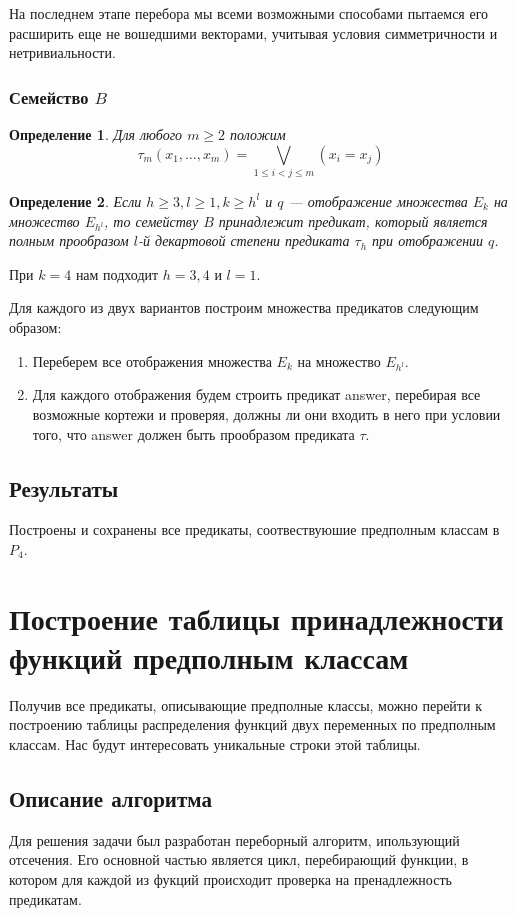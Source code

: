 \documentclass[a4paper,14pt]{extreport}
\newtheorem{opr}{Определение}
\begin{document}
На последнем этапе перебора мы  всеми возможными способами пытаемся его расширить еще не вошедшими векторами, учитывая условия симметричности и нетривиальности.

\subsection{Семейство $B$}
\begin{opr}
Для любого $m \geqslant 2$ положим
$$ \tau_m(x_1, \ldots, x_m) = \bigvee_{1\leqslant i < j \leqslant m}(x_i=x_j) $$
\end{opr}
\begin{opr}
Если $h \geqslant 3, l \geqslant 1, k \geqslant h^l$ и $q$ — отображение множества $E_k$ на  множество $E_{h^l}$, то семейству $B$ принадлежит предикат, который является полным прообразом $l$-й декартовой степени предиката $\tau_h$ при отображении $q$.
\end{opr}
При $k=4$ нам подходит $h=3,4$ и $l=1$.

Для каждого из двух вариантов построим множества предикатов следующим образом:
\begin{enumerate}
\item Переберем все отображения множества $E_k$ на  множество $E_{h^l}$.
\item Для каждого отображения будем строить предикат answer, перебирая все возможные кортежи и проверяя, должны ли они входить в него при условии того, что answer должен быть прообразом предиката $\tau$.
\end{enumerate} 

\section{Результаты}
Построены и сохранены все предикаты, соотвествуюшие предполным классам в $P_4$.  


\newpage
\chapter{Построение таблицы принадлежности функций предполным классам}
Получив все предикаты, описывающие предполные классы, можно перейти к построению таблицы распределения функций двух переменных по предполным классам. Нас будут интересовать уникальные строки этой таблицы. 

\section{Описание алгоритма}
Для решения задачи был разработан переборный алгоритм, ипользующий отсечения. Его основной частью является цикл, перебирающий функции, в котором для каждой из фукций происходит проверка на пренадлежность предикатам.
\end{document}
